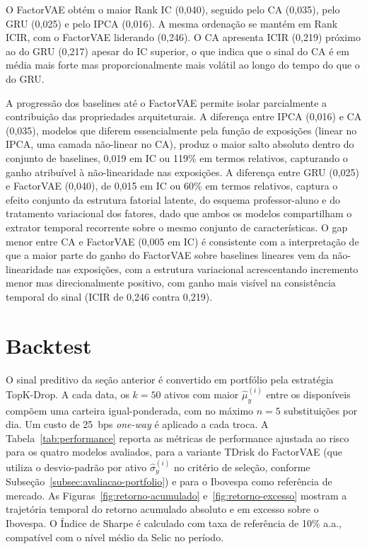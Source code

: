 O FactorVAE obtém o maior Rank IC (0{,}040), seguido pelo CA (0{,}035), pelo GRU (0{,}025) e pelo IPCA (0{,}016). A mesma ordenação se mantém em Rank ICIR, com o FactorVAE liderando (0{,}246). O CA apresenta ICIR (0{,}219) próximo ao do GRU (0{,}217) apesar do IC superior, o que indica que o sinal do CA é em média mais forte mas proporcionalmente mais volátil ao longo do tempo do que o do GRU.

A progressão dos baselines até o FactorVAE permite isolar parcialmente a contribuição das propriedades arquiteturais. A diferença entre IPCA (0{,}016) e CA (0{,}035), modelos que diferem essencialmente pela função de exposições (linear no IPCA, uma camada não-linear no CA), produz o maior salto absoluto dentro do conjunto de baselines, 0{,}019 em IC ou 119\% em termos relativos, capturando o ganho atribuível à não-linearidade nas exposições. A diferença entre GRU (0{,}025) e FactorVAE (0{,}040), de 0{,}015 em IC ou 60\% em termos relativos, captura o efeito conjunto da estrutura fatorial latente, do esquema professor-aluno e do tratamento variacional dos fatores, dado que ambos os modelos compartilham o extrator temporal recorrente sobre o mesmo conjunto de características. O gap menor entre CA e FactorVAE (0{,}005 em IC) é consistente com a interpretação de que a maior parte do ganho do FactorVAE sobre baselines lineares vem da não-linearidade nas exposições, com a estrutura variacional acrescentando incremento menor mas direcionalmente positivo, com ganho mais visível na consistência temporal do sinal (ICIR de 0{,}246 contra 0{,}219).


\section{Backtest}
\label{sec:resultados-performance}

O sinal preditivo da seção anterior é convertido em portfólio pela estratégia TopK-Drop. A cada data, os $k = 50$ ativos com maior $\hat{\mu}_y^{(i)}$ entre os disponíveis compõem uma carteira igual-ponderada, com no máximo $n = 5$ substituições por dia. Um custo de 25~bps \textit{one-way} é aplicado a cada troca. A Tabela~\ref{tab:performance} reporta as métricas de performance ajustada ao risco para os quatro modelos avaliados, para a variante TDrisk do FactorVAE (que utiliza o desvio-padrão por ativo $\hat{\sigma}_y^{(i)}$ no critério de seleção, conforme Subseção~\ref{subsec:avaliacao-portfolio}) e para o Ibovespa como referência de mercado. As Figuras~\ref{fig:retorno-acumulado} e~\ref{fig:retorno-excesso} mostram a trajetória temporal do retorno acumulado absoluto e em excesso sobre o Ibovespa. O Índice de Sharpe é calculado com taxa de referência de 10\% a.a., compatível com o nível médio da Selic no período.

